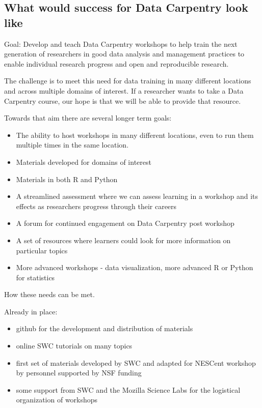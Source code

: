 \documentclass[11pt]{article}
\begin{document}
\subsection{What would success for Data Carpentry look like}

\hangindent=0.7cm Goal: Develop and teach Data Carpentry workshops to help train the next generation of researchers in good data analysis and management practices to enable individual research progress and open and reproducible research. 

The challenge is to meet this need for data training in many different locations and across multiple domains of interest.
 If a researcher wants to take a Data Carpentry course, our hope is that we will be able to provide that resource. 
 
Towards that aim there are several longer term goals:

\begin{itemize}
\item The ability to host workshops in many different locations, even to run
them multiple times in the same location. 
\item Materials developed for domains of interest 
\item Materials in both R and Python 
\item A streamlined assessment where we can assess learning in a workshop and its effects
as researchers progress through their careers
\item A forum for continued engagement on Data Carpentry post workshop
\item A set of resources where learners could look for more information on particular topics
\item More advanced workshops - data visualization, more advanced R or Python for statistics
\end{itemize}


How these needs can be met.

Already in place:
\begin{itemize}
\item github for the development and distribution of materials
\item online SWC tutorials on many topics
\item first set of materials developed by SWC and adapted for NESCent workshop by personnel supported by NSF funding
\item some support from SWC and the Mozilla Science Labs for the logistical organization of workshops
\end{itemize}
\end{document}
